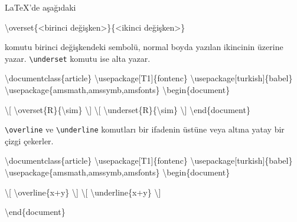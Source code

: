 \documentclass[
  letterpaper,
  DIV=11,
  numbers=noendperiod]{scrreprt}
\newenvironment{Shaded}{\begin{snugshade}}{\end{snugshade}}
\newcommand{\BuiltInTok}[1]{\textcolor[rgb]{0.00,0.23,0.31}{#1}}
\newcommand{\ExtensionTok}[1]{\textcolor[rgb]{0.00,0.23,0.31}{#1}}
\newcommand{\FunctionTok}[1]{\textcolor[rgb]{0.28,0.35,0.67}{#1}}
\newcommand{\KeywordTok}[1]{\textcolor[rgb]{0.00,0.23,0.31}{#1}}
\newcommand{\NormalTok}[1]{\textcolor[rgb]{0.00,0.23,0.31}{#1}}
\newcommand{\SpecialCharTok}[1]{\textcolor[rgb]{0.37,0.37,0.37}{#1}}
\newcommand{\SpecialStringTok}[1]{\textcolor[rgb]{0.13,0.47,0.30}{#1}}
\begin{document}
{\LaTeX}'de aşağıdaki

\begin{Shaded}
\begin{Highlighting}[]
\FunctionTok{\textbackslash{}overset}\NormalTok{\{\textless{}birinci değişken\textgreater{}\}\{\textless{}ikinci değişken\textgreater{}\}}
\end{Highlighting}
\end{Shaded}

komutu birinci değişkendeki sembolü, normal boyda yazılan ikincinin
üzerine yazar. \texttt{\textbackslash{}underset} komutu ise alta yazar.

\begin{Shaded}
\begin{Highlighting}[]
\BuiltInTok{\textbackslash{}documentclass}\NormalTok{\{}\ExtensionTok{article}\NormalTok{\}}
\BuiltInTok{\textbackslash{}usepackage}\NormalTok{[T1]\{}\ExtensionTok{fontenc}\NormalTok{\}}
\BuiltInTok{\textbackslash{}usepackage}\NormalTok{[turkish]\{}\ExtensionTok{babel}\NormalTok{\}}
\BuiltInTok{\textbackslash{}usepackage}\NormalTok{\{}\ExtensionTok{amsmath,amssymb,amsfonts}\NormalTok{\}}
\KeywordTok{\textbackslash{}begin}\NormalTok{\{}\ExtensionTok{document}\NormalTok{\}}

\SpecialStringTok{\textbackslash{}[}
\SpecialCharTok{\textbackslash{}overset}\SpecialStringTok{\{R\}\{}\SpecialCharTok{\textbackslash{}sim}\SpecialStringTok{\}}
\SpecialStringTok{\textbackslash{}]}
\SpecialStringTok{\textbackslash{}[}
\SpecialCharTok{\textbackslash{}underset}\SpecialStringTok{\{R\}\{}\SpecialCharTok{\textbackslash{}sim}\SpecialStringTok{\}}
\SpecialStringTok{\textbackslash{}]}
\KeywordTok{\textbackslash{}end}\NormalTok{\{}\ExtensionTok{document}\NormalTok{\}}
\end{Highlighting}
\end{Shaded}

\texttt{\textbackslash{}overline} ve \texttt{\textbackslash{}underline}
komutları bir ifadenin üstüne veya altına yatay bir çizgi çekerler.

\begin{Shaded}
\begin{Highlighting}[]
\BuiltInTok{\textbackslash{}documentclass}\NormalTok{\{}\ExtensionTok{article}\NormalTok{\}}
\BuiltInTok{\textbackslash{}usepackage}\NormalTok{[T1]\{}\ExtensionTok{fontenc}\NormalTok{\}}
\BuiltInTok{\textbackslash{}usepackage}\NormalTok{[turkish]\{}\ExtensionTok{babel}\NormalTok{\}}
\BuiltInTok{\textbackslash{}usepackage}\NormalTok{\{}\ExtensionTok{amsmath,amssymb,amsfonts}\NormalTok{\}}
\KeywordTok{\textbackslash{}begin}\NormalTok{\{}\ExtensionTok{document}\NormalTok{\}}

\SpecialStringTok{\textbackslash{}[}
\SpecialCharTok{\textbackslash{}overline}\SpecialStringTok{\{x+y\}}
\SpecialStringTok{\textbackslash{}]}
\SpecialStringTok{\textbackslash{}[}
\SpecialCharTok{\textbackslash{}underline}\SpecialStringTok{\{x+y\}}
\SpecialStringTok{\textbackslash{}]}

\KeywordTok{\textbackslash{}end}\NormalTok{\{}\ExtensionTok{document}\NormalTok{\}}
\end{Highlighting}
\end{Shaded}
\end{document}

